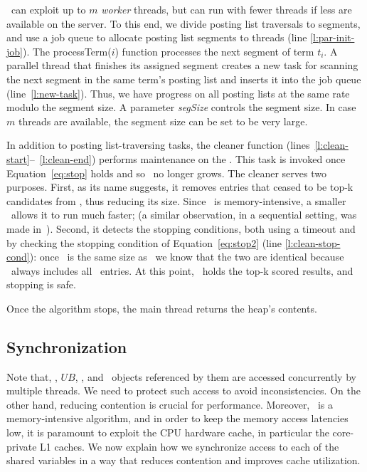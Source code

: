 

\alg\ can exploit up to $m$ {\em worker\/} threads, but can run with fewer threads if less are available on the server. 
To this end, we divide posting list traversals to segments, and use a job queue to allocate posting list segments to threads (line \ref{l:par-init-job}). 
The  {\sc processTerm($i$)} function processes the next segment of term $t_i$. 
A parallel thread that finishes its assigned segment creates a new task for scanning the next segment in the same term's posting list and inserts it into the job queue (line~\ref{l:new-task}). Thus, we have progress on all posting lists at the same rate modulo the segment size. A parameter 
\emph{segSize} controls the segment size.
In case $m$ threads are available, the segment size can be 
set to be very large.

In addition to  posting list-traversing tasks, the 
{\sc cleaner} function (lines~\ref{l:clean-start}--~\ref{l:clean-end}) performs maintenance on the \DMap.
This task is invoked once Equation~\ref{eq:stop} holds and so  \DMap\ no longer grows.
The cleaner serves two purposes. First, as its name suggests, it removes 
entries that ceased to be top-k candidates from \DMap, thus reducing its size.  
Since \alg\ is memory-intensive, a smaller \DMap\  allows it to run much faster; 
(a similar observation, in a sequential setting, was made in~\cite{Gursky:2008}). 
Second, it detects the stopping conditions,
both using a timeout and by checking the stopping condition of Equation~\ref{eq:stop2} (line \ref{l:clean-stop-cond}): 
once \DMap\ is the same size as \DHeap\ we know that the two are identical because \DMap\ always includes all \DHeap\ entries. At this point, \DHeap\ holds the top-k scored results, and stopping is safe. 

Once the algorithm stops, the main thread returns the heap's contents. 

\subsection{Synchronization} 
\label{sec:synch}

Note that, \DHeap, $UB$, \DMap, and \Docobj\ objects referenced by them are accessed concurrently by multiple threads. We need to protect such access to avoid inconsistencies. On the other hand, reducing contention is crucial for performance. Moreover, 
\alg\ is a memory-intensive algorithm, and 
in order to keep the memory access latencies low, it is paramount to exploit the CPU hardware cache, in particular the core-private L1 caches. 
We now explain how we synchronize access to each of the shared variables
in a way that reduces contention and improves cache utilization. 


